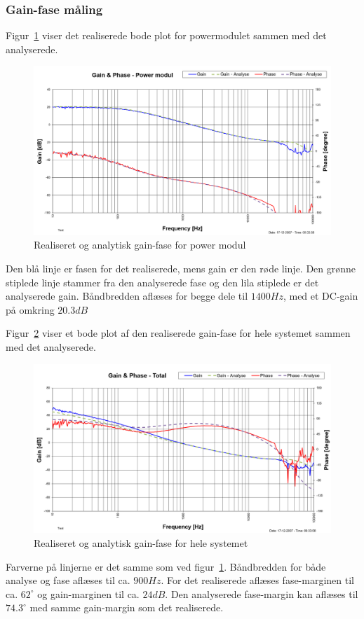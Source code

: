 \subsubsection{Gain-fase måling}
Figur~\ref{fig:realisering_gain_fase_power} viser det realiserede bode plot for powermodulet sammen med det analyserede.
\begin{figure}[H]
	\center
	\includegraphics[max width=0.7\linewidth]{../dokumentation/tex/2iteration/billeder/Realisering/Realisering_gain_fase_power.png}
	\caption{Realiseret og analytisk gain-fase for power modul}
	\label{fig:realisering_gain_fase_power}
\end{figure}
Den blå linje er fasen for det realiserede, mens gain er den røde linje. Den grønne stiplede linje stammer fra den analyserede fase og den lila stiplede er det analyserede gain. Båndbredden aflæses for begge dele til $1400Hz$, med et DC-gain på omkring $20.3dB$

Figur~\ref{fig:realisering_gain_fase_tot} viser et bode plot af den realiserede gain-fase for hele systemet sammen med det analyserede.
\begin{figure}[H]
	\center
	\includegraphics[max width=0.7\linewidth]{../dokumentation/tex/2iteration/billeder/Realisering/Realisering_gain_fase_tot.png}
	\caption{Realiseret og analytisk gain-fase for hele systemet}
	\label{fig:realisering_gain_fase_tot}
\end{figure}
Farverne på linjerne er det samme som ved figur~\ref{fig:realisering_gain_fase_power}. Båndbredden for både analyse og fase aflæses til ca. $900Hz$. For det realiserede aflæses fase-marginen til ca. $62^\circ$ og gain-marginen til ca. $24dB$. Den analyserede fase-margin kan aflæses til $74.3^\circ$ med samme gain-margin som det realiserede.

